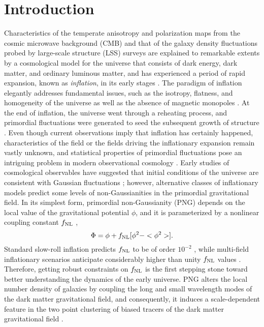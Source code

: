 \section{Introduction}
\label{sec:introduction}
Characteristics of the temperate anisotropy and polarization maps from the cosmic microwave background (CMB) and that of the galaxy density fluctuations probed by large-scale structure (LSS) surveys are explained to remarkable extents by a cosmological model for the universe that consists of dark energy, dark matter, and ordinary luminous matter, and has experienced a period of rapid expansion, known as \textit{inflation}, in its early stages \citep[see, e.g.,][for a review]{weinberg2013observational}. The paradigm of inflation elegantly addresses fundamental issues, such as the isotropy, flatness, and homogeneity of the universe as well as the absence of magnetic monopoles \citep[see, e.g.,][]{weinberg2008cosmology}. At the end of inflation, the universe went through a reheating process, and primordial fluctuations were generated to seed the subsequent growth of structure \citep{kofman1994reheating, bassett2006inflation, lyth2009primordial}. Even though current observations imply that inflation has certainly happened, characteristics of the field or the fields driving the inflationary expansion remain vastly unknown, and statistical properties of primordial fluctuations pose an intriguing problem in modern observational cosmology \citep[see, e.g.,][for a review]{Biagetti2019Galax...7...71B}. Early studies of cosmological observables have suggested that initial conditions of the universe are consistent with Gaussian fluctuations \citep{PhysRevD.69.103501, guth2005inflationary}; however, alternative classes of inflationary models predict some levels of non-Gaussianities in the primordial gravitational field. In its simplest form, primordial non-Gaussianity (PNG) depends on the local value of the gravitational potential $\phi$, and it is parameterized by a nonlinear coupling constant $f_{\rm NL}$ \citep{komatsu2001acoustic},
\begin{equation}
 \Phi = \phi + f_{\rm NL} [\phi^{2} - <\phi^{2}>].
\end{equation}
Standard slow-roll inflation predicts $f_{\rm NL}$ to be of order $10^{-2}$ \citep[see, e.g.,][for a review]{alvarez2014arXiv1412.4671A}, while multi-field inflationary scenarios anticipate considerably higher than unity $f_{\rm NL}$ values \citep[see, e.g.,][]{de2017next}. Therefore, getting robust constraints on $f_{\rm NL}$ is the first stepping stone toward better understanding the dynamics of the early universe. PNG alters the local number density of galaxies by coupling the long and small wavelength modes of the dark matter gravitational field, and consequently, it induces a scale-dependent feature in the two point clustering of biased tracers of the dark matter gravitational field \citep{dalal2008imprints}.

